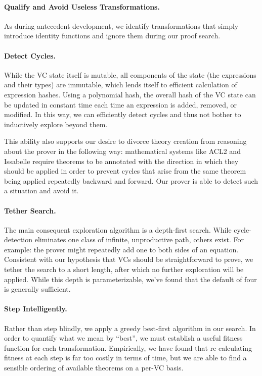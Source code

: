 \paragraph{Qualify and Avoid Useless Transformations.}  As during antecedent development, we identify transformations that simply introduce identity functions and ignore them during our proof search.

\paragraph{Detect Cycles.}  While the VC state itself is mutable, all components of the state (the expressions and their types) are immutable, which lends itself to efficient calculation of expression hashes.  Using a polynomial hash, the overall hash of the VC state can be updated in constant time each time an expression is added, removed, or modified.  In this way, we can efficiently detect cycles and thus not bother to inductively explore beyond them.

This ability also supports our desire to divorce theory creation from reasoning about the prover in the following way: mathematical systems like ACL2\cite{kaufmannACL2} and Issabelle\cite{wenzelIsar} require theorems to be annotated with the direction in which they should be applied in order to prevent cycles that arise from the same theorem being applied repeatedly backward and forward.  Our prover is able to detect such a situation and avoid it.

\paragraph{Tether Search.}  The main consequent exploration algorithm is a depth-first search.  While cycle-detection eliminates one class of infinite, unproductive path, others exist.  For example: the prover might repeatedly add one to both sides of an equation.  Consistent with our hypothesis that VCs should be straightforward to prove, we tether the search to a short length, after which no further exploration will be applied.  While this depth is parameterizable, we've found that the default of four is generally sufficient.

\paragraph{Step Intelligently.}  Rather than step blindly, we apply a greedy best-first algorithm in our search.  In order to quantify what we mean by ``best'', we must establish a useful fitness function for each transformation.  Empirically, we have found that re-calculating fitness at each step is far too costly in terms of time, but we are able to find a sensible ordering of available theorems on a per-VC basis.

